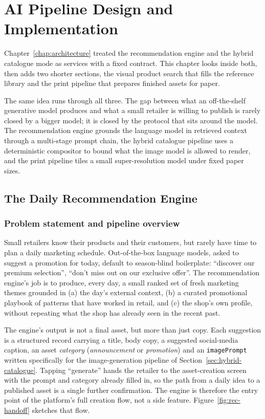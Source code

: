 \chapter{AI Pipeline Design and Implementation}
\label{chap:contributions}

Chapter~\ref{chap:architecture} treated the recommendation engine and the hybrid catalogue mode as services with a fixed contract. This chapter looks inside both, then adds two shorter sections, the visual product search that fills the reference library and the print pipeline that prepares finished assets for paper.

The same idea runs through all three. The gap between what an off-the-shelf generative model produces and what a small retailer is willing to publish is rarely closed by a bigger model; it is closed by the protocol that sits around the model. The recommendation engine grounds the language model in retrieved context through a multi-stage prompt chain, the hybrid catalogue pipeline uses a deterministic compositor to bound what the image model is allowed to render, and the print pipeline tiles a small super-resolution model under fixed paper sizes.

\section{The Daily Recommendation Engine}
\label{sec:recommendation-engine}

\subsection{Problem statement and pipeline overview}
\label{subsec:rec-problem}

Small retailers know their products and their customers, but rarely have time to plan a daily marketing schedule. Out-of-the-box language models, asked to suggest a promotion for today, default to season-blind boilerplate: ``discover our premium selection'', ``don't miss out on our exclusive offer''. The recommendation engine's job is to produce, every day, a small ranked set of fresh marketing themes grounded in (a) the day's external context, (b) a curated promotional playbook of patterns that have worked in retail, and (c) the shop's own profile, without repeating what the shop has already seen in the recent past.

The engine's output is not a final asset, but more than just copy. Each suggestion is a structured record carrying a title, body copy, a suggested social-media caption, an asset \emph{category} (\emph{announcement} or \emph{promotion}) and an \texttt{imagePrompt} written specifically for the image-generation pipeline of Section~\ref{sec:hybrid-catalogue}. Tapping ``generate'' hands the retailer to the asset-creation screen with the prompt and category already filled in, so the path from a daily idea to a published asset is a single further confirmation. The engine is therefore the entry point of the platform's full creation flow, not a side feature. Figure~\ref{fig:rec-handoff} sketches that flow.

